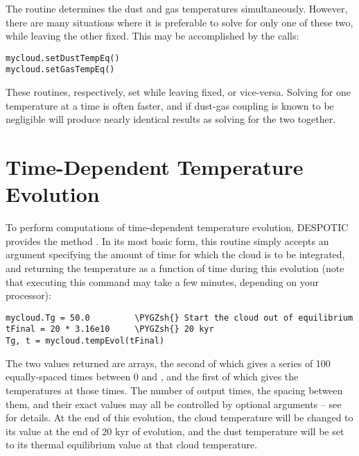 \documentclass[letterpaper,10pt,english]{sphinxmanual}
\def\PYGZsh{\char`\#}
\begin{document}
The  routine determines the dust and gas
temperatures simultaneously. However, there are many situations where
it is preferable to solve for only one of these two, while leaving the
other fixed. This may be accomplished by the calls:

\begin{Verbatim}[commandchars=\\\{\}]
mycloud.setDustTempEq()
mycloud.setGasTempEq()
\end{Verbatim}

These routines, respectively, set  while leaving
 fixed, or vice-versa. Solving for one temperature at a
time is often faster, and if dust-gas coupling is known to be
negligible will produce nearly identical results as solving for the
two together.


\section{Time-Dependent Temperature Evolution}
\label{functions:ssec-temp-evol}\label{functions:time-dependent-temperature-evolution}
To perform computations of time-dependent temperature evolution,
DESPOTIC provides the method . In its most basic
form, this routine simply accepts an argument specifying the amount of
time for which the cloud is to be integrated, and returning the
temperature as a function of time during this evolution (note that
executing this command may take a few minutes, depending on your
processor):

\begin{Verbatim}[commandchars=\\\{\}]
mycloud.Tg = 50.0         \PYGZsh{} Start the cloud out of equilibrium
tFinal = 20 * 3.16e10     \PYGZsh{} 20 kyr
Tg, t = mycloud.tempEvol(tFinal)
\end{Verbatim}

The two values returned are arrays, the second of which gives a series
of 100 equally-spaced times between 0 and , and the first of
which gives the temperatures at those times. The number of output
times, the spacing between them, and their exact values may all be
controlled by optional arguments -- see {\hyperref[fulldoc:sssec\string-full\string-cloud]{}} for
details. At
the end of this evolution, the cloud temperature 
will be changed to its value at the end of 20 kyr of evolution, and
the dust temperature  will be set to its thermal
equilibrium value at that cloud temperature.
\end{document}
